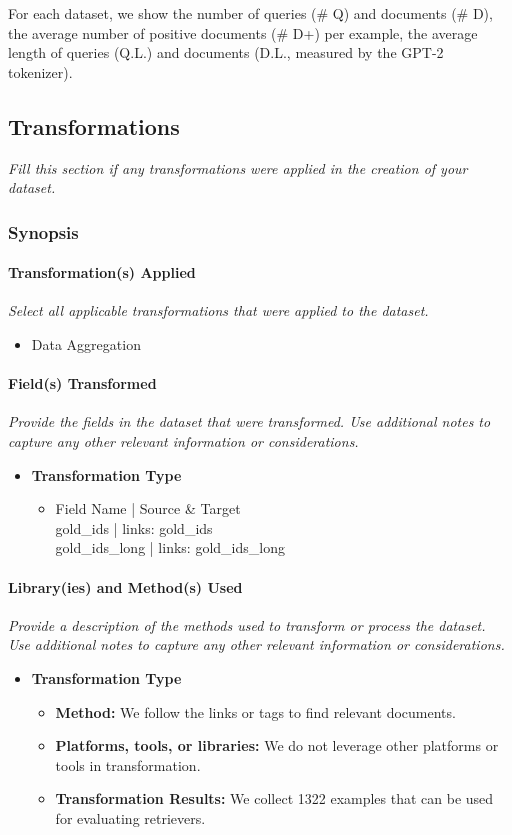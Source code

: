 For each dataset, we show the number of queries (\# Q) and documents (\# D), the average number of positive documents (\# D+) per example, the average length of queries (Q.L.) and documents (D.L., measured by the GPT-2 tokenizer).

\subsection{Transformations}
\textit{Fill this section if any transformations were applied in the creation of your dataset.}

\subsubsection{Synopsis}
\paragraph{Transformation(s) Applied}
\textit{Select all applicable transformations that were applied to the dataset.}
\begin{itemize}
    \item Data Aggregation
\end{itemize}

\paragraph{Field(s) Transformed}
\textit{Provide the fields in the dataset that were transformed. Use additional notes to capture any other relevant information or considerations.}
\begin{itemize}
    \item \textbf{Transformation Type}
    \begin{itemize}
        \item Field Name | Source \& Target \\
        gold\_ids | links: gold\_ids \\
        gold\_ids\_long | links: gold\_ids\_long
    \end{itemize}
\end{itemize}

\paragraph{Library(ies) and Method(s) Used}
\textit{Provide a description of the methods used to transform or process the dataset. Use additional notes to capture any other relevant information or considerations.}
\begin{itemize}
    \item \textbf{Transformation Type}
    \begin{itemize}
        \item \textbf{Method:} We follow the links or tags to find relevant documents.
        \item \textbf{Platforms, tools, or libraries:} We do not leverage other platforms or tools in transformation.
        \item \textbf{Transformation Results:} We collect 1322 examples that can be used for evaluating retrievers.
    \end{itemize}
\end{itemize}


